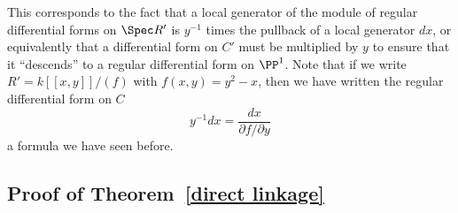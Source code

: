 \begin{example}
This corresponds to the fact that a local generator of the module of regular differential forms
on $\Spec R'$ is $y^{-1}$ times the pullback of a local generator $dx$, or equivalently
that a differential form on $C'$ must be multiplied by $y$ to ensure that it ``descends'' to a regular differential
form on $\PP^1$. Note that if we write
$R' = k[[x,y]]/(f)$  with $f(x,y) = y^2-x$, then we have written the regular differential form on $C$
$$
y^{-1}dx = \frac{dx}{\partial f/\partial y}
$$
a formula we have seen before.
\end{example}
 

\subsection{Proof of Theorem~\ref{direct linkage}}

